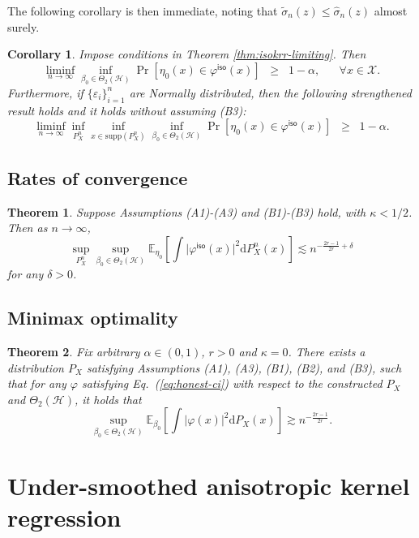 \documentclass[11pt,a4paper]{article}
\renewcommand{\hat}{\widehat}
\renewcommand{\tilde}{\widetilde}
\theoremstyle{definition}
\theoremstyle{plain}
\newtheorem{theorem}{Theorem}[section]
\newtheorem{corollary}{Corollary}[section]
\theoremstyle{remark}
\newcommand{\supp}{\mathrm{supp}}
\newcommand{\mX}{\mathcal X}
\newcommand{\ud}{\mathrm d}
\newcommand{\mH}{\mathcal H}
\newcommand{\iso}{\mathsf{iso}}
\begin{document}
The following corollary is then immediate, noting that $\tilde\sigma_n(z)\leq\hat\sigma_n(z)$ almost surely.
\begin{corollary}
Impose conditions in Theorem \ref{thm:isokrr-limiting}. Then
$$
\liminf_{n\to\infty}\inf_{\beta_0\in\Theta_2(\mH)}\Pr[\eta_0(x)\in\varphi^\iso(x)]\;\;\geq\;\; 1-\alpha,\;\;\;\;\;\;\forall x\in\mX.
$$
Furthermore, if $\{\varepsilon_i\}_{i=1}^n$ are Normally distributed, then the following strengthened result holds and it holds without assuming (B3):
$$
\liminf_{n\to\infty}\inf_{P_X^n}\inf_{x\in\supp(P_X^n)}\inf_{\beta_0\in\Theta_2(\mH)}\Pr[\eta_0(x)\in\varphi^\iso(x)] \;\;\geq\;\; 1-\alpha.
$$
\label{cor:isokrr-ci}
\end{corollary}

\subsection{Rates of convergence}

\begin{theorem}
Suppose Assumptions (A1)-(A3) and (B1)-(B3) hold, with $\kappa<1/2$. Then as $n\to\infty$, 
\begin{equation}
\sup_{P_X^n}\sup_{\beta_0\in\Theta_2(\mH)}\mathbb E_{\eta_0}\left[\int\big|\varphi^\iso(x)\big|^2\ud P_X^n(x)\right]\lesssim n^{-\frac{2r-1}{2r}+\delta}
\label{eq:simple-validity}
\end{equation}
for any $\delta>0$.
\label{thm:isokrr-rates}
\end{theorem}


\subsection{Minimax optimality}

\begin{theorem}
Fix arbitrary $\alpha\in(0,1)$, $r>0$ and $\kappa=0$. There exists a distribution $P_X$ satisfying Assumptions (A1), (A3), (B1), (B2), and (B3), such that for any $\varphi$ satisfying Eq.~(\ref{eq:honest-ci})
with respect to the constructed $P_X$ and $\Theta_2(\mH)$, it holds that
$$
\sup_{\beta_0\in\Theta_2(\mH)} \mathbb E_{\beta_0}\left[\int\big|\varphi(x)\big|^2\ud P_X(x)\right] \gtrsim n^{-\frac{2r-1}{2r}}.
$$
\label{thm:isokrr-lb}
\end{theorem}

\section{Under-smoothed anisotropic kernel regression}
\end{document}
